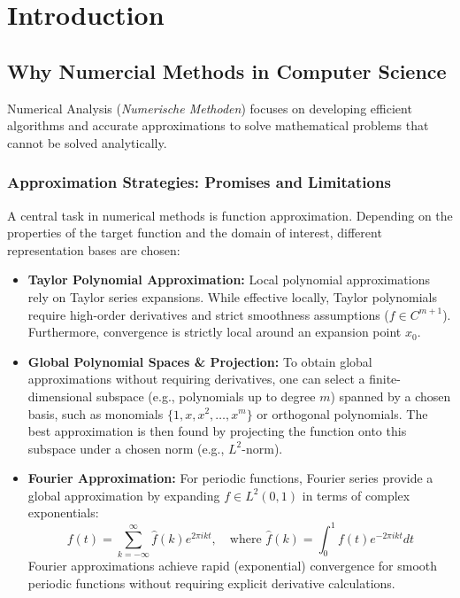 \section{Introduction}

\subsection{Why Numercial Methods in Computer Science}

Numerical Analysis (\textit{Numerische Methoden}) focuses on developing efficient algorithms and accurate approximations to solve mathematical problems that cannot be solved analytically.

\subsubsection{Approximation Strategies: Promises and Limitations}

A central task in numerical methods is function approximation. Depending on the properties of the target function and the domain of interest, different representation bases are chosen:

\begin{itemize}
    \item \textbf{Taylor Polynomial Approximation:} Local polynomial approximations rely on Taylor series expansions. While effective locally, Taylor polynomials require high-order derivatives and strict smoothness assumptions ($f \in C^{m+1}$). Furthermore, convergence is strictly local around an expansion point $x_0$.
    \item \textbf{Global Polynomial Spaces \& Projection:} To obtain global approximations without requiring derivatives, one can select a finite-dimensional subspace (e.g., polynomials up to degree $m$) spanned by a chosen basis, such as monomials $\{1, x, x^2, \dots, x^m\}$ or orthogonal polynomials. The best approximation is then found by projecting the function onto this subspace under a chosen norm (e.g., $L^2$-norm).
    \item \textbf{Fourier Approximation:} For periodic functions, Fourier series provide a global approximation by expanding $f \in L^2(0,1)$ in terms of complex exponentials:
    \[
    f(t) = \sum_{k=-\infty}^{\infty} \hat{f}(k) e^{2\pi i k t}, \quad \text{where } \hat{f}(k) = \int_{0}^{1} f(t) e^{-2\pi i k t} dt
    \]
    Fourier approximations achieve rapid (exponential) convergence for smooth periodic functions without requiring explicit derivative calculations.
\end{itemize}

